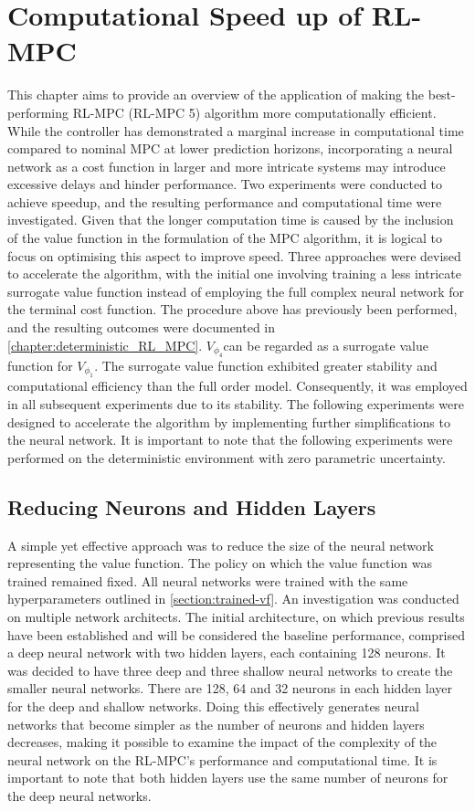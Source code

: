 \chapter{Computational Speed up of RL-MPC}
\label{chapter:speed-up}

This chapter aims to provide an overview of the application of making the best-performing RL-MPC (RL-MPC 5) algorithm more computationally efficient. While the controller has demonstrated a marginal increase in computational time compared to nominal MPC at lower prediction horizons, incorporating a neural network as a cost function in larger and more intricate systems may introduce excessive delays and hinder performance. Two experiments were conducted to achieve speedup, and the resulting performance and computational time were investigated. Given that the longer computation time is caused by the inclusion of the value function in the formulation of the MPC algorithm, it is logical to focus on optimising this aspect to improve speed. Three approaches were devised to accelerate the algorithm, with the initial one involving training a less intricate surrogate value function instead of employing the full complex neural network for the terminal cost function. The procedure above has previously been performed, and the resulting outcomes were documented in \autoref{chapter:deterministic_RL_MPC}. ${V}_{\phi_4}$can be regarded as a surrogate value function for ${V}_{\phi_1}$. The surrogate value function exhibited greater stability and computational efficiency than the full order model. Consequently, it was employed in all subsequent experiments due to its stability. The following experiments were designed to accelerate the algorithm by implementing further simplifications to the neural network. It is important to note that the following experiments were performed on the deterministic environment with zero parametric uncertainty.

\section{Reducing Neurons and Hidden Layers}
A simple yet effective approach was to reduce the size of the neural network representing the value function. The policy on which the value function was trained remained fixed. All neural networks were trained with the same hyperparameters outlined in \autoref{section:trained-vf}. An investigation was conducted on multiple network architects. The initial architecture, on which previous results have been established and will be considered the baseline performance, comprised a deep neural network with two hidden layers, each containing 128 neurons. It was decided to have three deep and three shallow neural networks to create the smaller neural networks. There are 128, 64 and 32 neurons in each hidden layer for the deep and shallow networks. Doing this effectively generates neural networks that become simpler as the number of neurons and hidden layers decreases, making it possible to examine the impact of the complexity of the neural network on the RL-MPC’s performance and computational time. It is important to note that both hidden layers use the same number of neurons for the deep neural networks.

